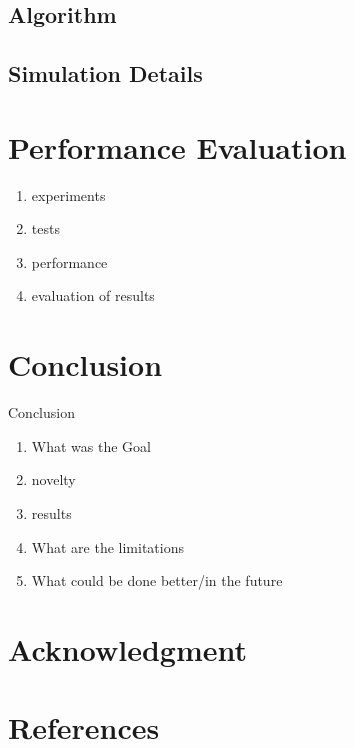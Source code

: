 \documentclass[11pt, conference]{IEEEtran}
\begin{document}
\subsection{Algorithm}
\subsection{Simulation Details}


\section{Performance Evaluation}
\begin{enumerate}
   \item experiments
   \item tests
   \item performance
   \item evaluation of results
\end{enumerate}


\section{Conclusion}

Conclusion
\begin{enumerate}
   \item What was the Goal
   \item novelty
   \item results
   \item What are the limitations
   \item What could be done better/in the future
\end{enumerate}

\section*{Acknowledgment}

\section*{References}
\end{document}
